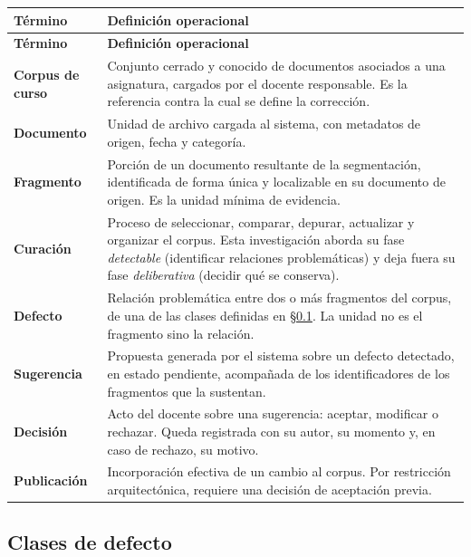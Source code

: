 \begin{xltabular}{\textwidth}{@{}L{3.6cm} X@{}}
\toprule
\textbf{Término} & \textbf{Definición operacional} \\
\midrule
\endfirsthead
\toprule
\textbf{Término} & \textbf{Definición operacional} \\
\midrule
\endhead
\bottomrule
\endfoot

\textbf{Corpus de curso} &
Conjunto cerrado y conocido de documentos asociados a una asignatura, cargados por
el docente responsable. Es la referencia contra la cual se define la corrección. \\

\textbf{Documento} &
Unidad de archivo cargada al sistema, con metadatos de origen, fecha y categoría. \\

\textbf{Fragmento} &
Porción de un documento resultante de la segmentación, identificada de forma única y
localizable en su documento de origen. Es la unidad mínima de evidencia. \\

\textbf{Curación} &
Proceso de seleccionar, comparar, depurar, actualizar y organizar el corpus. Esta
investigación aborda su fase \emph{detectable} (identificar relaciones problemáticas)
y deja fuera su fase \emph{deliberativa} (decidir qué se conserva). \\

\textbf{Defecto} &
Relación problemática entre dos o más fragmentos del corpus, de una de las clases
definidas en §\ref{sec:conc-defectos}. La unidad no es el fragmento sino la relación. \\

\textbf{Sugerencia} &
Propuesta generada por el sistema sobre un defecto detectado, en estado pendiente,
acompañada de los identificadores de los fragmentos que la sustentan. \\

\textbf{Decisión} &
Acto del docente sobre una sugerencia: aceptar, modificar o rechazar. Queda
registrada con su autor, su momento y, en caso de rechazo, su motivo. \\

\textbf{Publicación} &
Incorporación efectiva de un cambio al corpus. Por restricción arquitectónica,
requiere una decisión de aceptación previa. \\
\end{xltabular}

\subsection{Clases de defecto}
\label{sec:conc-defectos}


